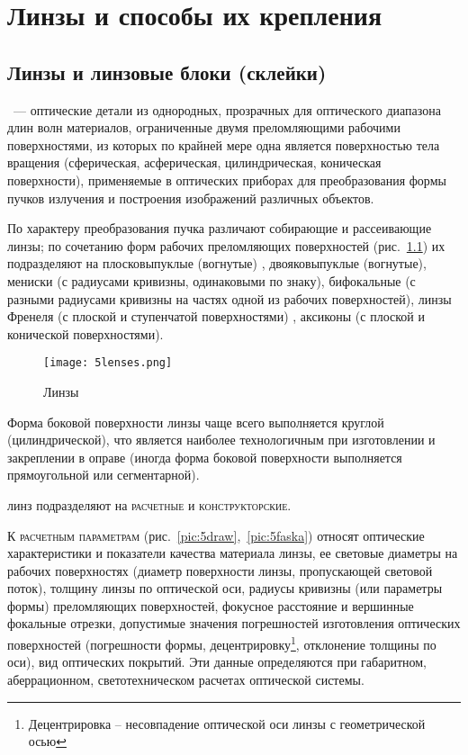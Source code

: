 \chapter{Линзы и способы их крепления}
\section{Линзы и линзовые блоки (склейки)}

~--- оптические детали из однородных, прозрачных для оптического диапазона длин волн материалов, ограниченные двумя преломляющими рабочими поверхностями, из которых по крайней мере одна является поверхностью тела вращения (сферическая, асферическая, цилиндрическая, коническая поверхности), применяемые в оптических приборах для преобразования формы пучков излучения и построения изображений различных объектов.

По характеру преобразования пучка различают собирающие и рассеивающие линзы; по сочетанию форм рабочих преломляющих поверхностей (рис.~\ref{pic:5lenses}) их подразделяют на плосковыпуклые (вогнутые) , двояковыпуклые (вогнутые), мениски (с радиусами кривизны, одинаковыми по знаку), бифокальные (с разными радиусами кривизны на частях одной из рабочих поверхностей), линзы Френеля (с плоской и ступенчатой поверхностями) , аксиконы (с плоской и конической поверхностями).

\begin{figure}[h!]
	\texttt{[image: 5lenses.png]}
	\caption{Линзы}
	\label{pic:5lenses}
\end{figure}

Форма боковой поверхности линзы чаще всего выполняется круглой (цилиндрической), что является наиболее технологичным при изготовлении и закреплении в оправе (иногда форма боковой поверхности выполняется прямоугольной или сегментарной).

 линз подразделяют на \textsc{расчетные} и \textsc{конструкторские}.

К \textsc{расчетным параметрам} (рис.~\ref{pic:5draw},~\ref{pic:5faska}) относят оптические характеристики и показатели качества материала линзы, ее световые диаметры на рабочих поверхностях (диаметр поверхности линзы, пропускающей световой поток), толщину линзы по оптической оси, радиусы кривизны (или параметры формы) преломляющих поверхностей, фокусное расстояние и вершинные фокальные отрезки, допустимые значения погрешностей изготовления оптических поверхностей (погрешности формы, децентрировку\footnote{Децентрировка -- несовпадение оптической оси линзы с геометрической осью}, отклонение толщины по оси), вид оптических покрытий. Эти данные определяются при габаритном, аберрационном, светотехническом расчетах оптической системы.

